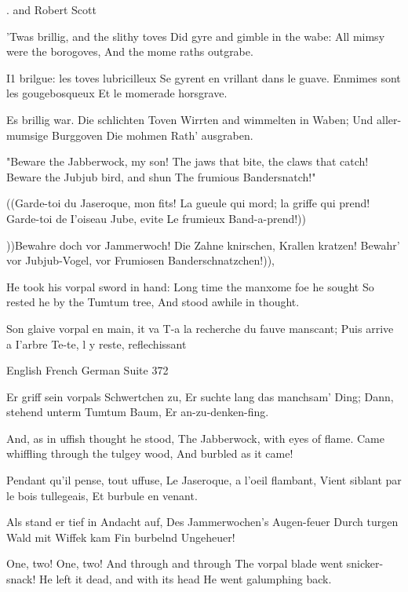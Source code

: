                                . and Robert Scott

'Twas brillig, and the slithy toves
Did gyre and gimble in the wabe:
All mimsy were the borogoves,
And the mome raths outgrabe.

       I1 brilgue: les toves lubricilleux
       Se gyrent en vrillant dans le guave.
       Enmimes sont les gougebosqueux
       Et le momerade horsgrave.

               Es brillig war. Die schlichten Toven
               Wirrten and wimmelten in Waben;
               Und aller-mumsige Burggoven
               Die mohmen Rath' ausgraben.

"Beware the Jabberwock, my son!
The jaws that bite, the claws that catch!
Beware the Jubjub bird, and shun
The frumious Bandersnatch!"

       ((Garde-toi du Jaseroque, mon fits!
       La gueule qui mord; la griffe qui prend!
       Garde-toi de I'oiseau Jube, evite
       Le frumieux Band-a-prend!))

               ))Bewahre doch vor Jammerwoch!
               Die Zahne knirschen, Krallen kratzen!
               Bewahr' vor Jubjub-Vogel, vor
               Frumiosen Banderschnatzchen!)),

He took his vorpal sword in hand:
Long time the manxome foe he sought
So rested he by the Tumtum tree,
And stood awhile in thought.

       Son glaive vorpal en main, it va
       T-a la recherche du fauve manscant;
       Puis arrive a I'arbre Te-te,
       l y reste, reflechissant


English French German Suite                            372

              Er griff sein vorpals Schwertchen zu,
              Er suchte lang das manchsam' Ding;
              Dann, stehend unterm Tumtum Baum,
              Er an-zu-denken-fing.

And, as in uffish thought he stood,
The Jabberwock, with eyes of flame.
Came whiffling through the tulgey wood,
And burbled as it came!

       Pendant qu'il pense, tout uffuse,
       Le Jaseroque, a l'oeil flambant,
       Vient siblant par le bois tullegeais,
       Et burbule en venant.

              Als stand er tief in Andacht auf,
              Des Jammerwochen's Augen-feuer
              Durch turgen Wald mit Wiffek kam
              Fin burbelnd Ungeheuer!

One, two! One, two! And through and through
The vorpal blade went snicker-snack!
He left it dead, and with its head
He went galumphing back.

